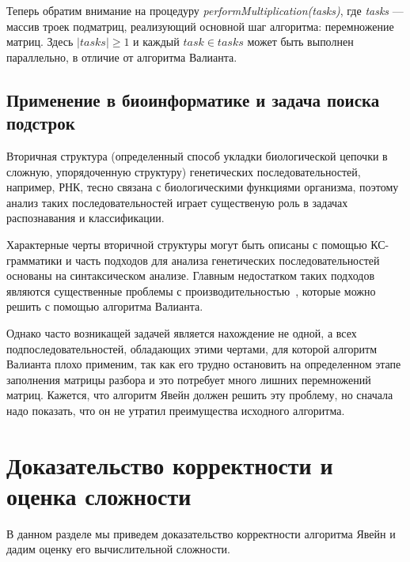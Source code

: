 \documentclass[14pt]{matmex-diploma-custom}
\begin{document}
Теперь обратим внимание на процедуру \textit{performMultiplication(tasks)}, где \textit{tasks} --- массив троек подматриц, реализующий основной шаг алгоритма: перемножение матриц.
Здесь $|tasks| \ge 1$ и каждый $task \in tasks$ может быть выполнен параллельно, в отличие от алгоритма Валианта.

\subsection{Применение в биоинформатике и задача поиска подстрок}

Вторичная структура (определенный способ укладки биологической цепочки в сложную, упорядоченную структуру) генетических последовательностей, например, РНК, тесно связана с биологическими функциями организма, поэтому анализ таких последовательностей играет существеную роль в задачах распознавания и классификации.

Характерные черты вторичной структуры могут быть описаны с помощью КС-грамматики и часть подходов для анализа генетических последовательностей основаны на синтаксическом анализе. Главным недостатком таких подходов являются существенные проблемы с производительностью~\cite{durbin1996biological}, которые можно решить с помощью алгоритма Валианта.

Однако часто возникащей задачей является нахождение не одной, а всех подпоследовательностей, обладающих этими чертами, для которой алгоритм Валианта плохо применим,  так как его трудно остановить на определенном этапе заполнения матрицы разбора и это потребует много лишних перемножений матриц. 
Кажется, что алгоритм Явейн должен решить эту проблему, но сначала надо показать, что он не утратил преимущества исходного алгоритма.

\section{Доказательство корректности и оценка сложности}

В данном разделе мы приведем доказательство корректности алгоритма Явейн и дадим оценку его вычислительной сложности.
\end{document}
